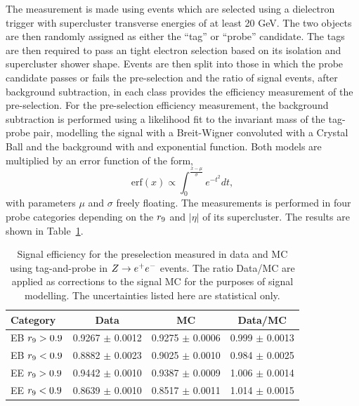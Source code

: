 The measurement is made using events which are selected using a dielectron
trigger with supercluster transverse energies of at least 20 GeV. The two objects are then 
randomly assigned as either the ``tag'' or ``probe'' candidate. The tags are then required to 
pass an tight electron selection based on its isolation and supercluster shower shape.
Events are then split into those in which the probe candidate passes or fails the pre-selection
and the ratio of signal events, after background subtraction, in each class provides the 
efficiency measurement of the pre-selection. For the pre-selection efficiency measurement, 
the background subtraction is performed using a likelihood fit to the invariant 
mass of the tag-probe pair, modelling the signal with a Breit-Wigner convoluted with a 
Crystal Ball and the background with and exponential function. 
Both models are multiplied by an error function of the form,
\begin{equation}
\mathrm{erf}(x)\propto \int_{0}^{\frac{x-\mu}{\sigma}} e^{-t^{2}}dt,
\end{equation}
with parameters $\mu$ and $\sigma$ freely floating. The measurements is performed
in four probe categories depending on the $r_{9}$ and $|\eta|$ of its supercluster.
The results are shown in Table~\ref{tab:sigeffpresel}. 

\begin{table}
\begin{tabular}{| l | c | c | c |}
\hline
\textbf{Category} & \textbf{Data} & \textbf{MC} & \textbf{Data/MC} \\
\hline
EB $r_{9}>0.9$ & 0.9267 $\pm$ 0.0012 & 0.9275 $\pm$ 0.0006 &0.999 $\pm$ 0.0013 \\
EB $r_{9}<0.9$ & 0.8882 $\pm$ 0.0023 & 0.9025 $\pm$ 0.0010 &0.984 $\pm$ 0.0025 \\
EE $r_{9}>0.9$ & 0.9442 $\pm$ 0.0010 & 0.9387 $\pm$ 0.0009 &1.006 $\pm$ 0.0014 \\
EE $r_{9}<0.9$ & 0.8639 $\pm$ 0.0010 & 0.8517 $\pm$ 0.0011 &1.014 $\pm$ 0.0015 \\
\hline
\end{tabular}
\caption{Signal efficiency for the preselection measured in data and MC using tag-and-probe in
$Z\rightarrow e^{+}e^{-}$ events. The ratio Data/MC are applied as corrections to the signal MC for the purposes
of signal modelling. The uncertainties listed here are statistical only.}
\label{tab:sigeffpresel}
\end{table}


